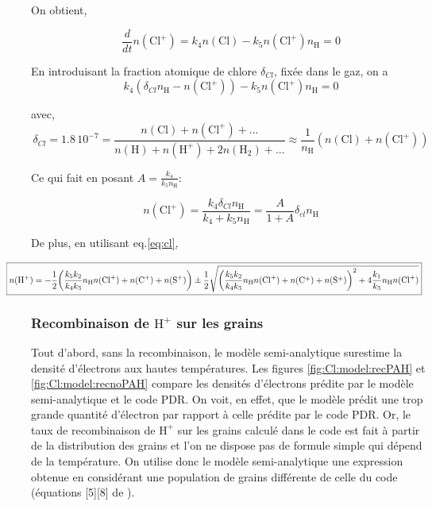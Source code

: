 On obtient,

\begin{equation}
     \frac{d}{dt}n(\mathrm{Cl}^+) = k_4 n(\mathrm{Cl}) - k_5 n(\mathrm{Cl}^+) n_{\mathrm{H}} = 0
     \label{eq:cl}
\end{equation}


En introduisant la fraction atomique de chlore $\delta_{Cl}$, fixée dans le gaz, on a 
\begin{equation}
    k_4(\delta_{Cl}n_{\mathrm{H}} - n(\mathrm{Cl}^+)) - k_5 n(\mathrm{Cl}^+) n_{\mathrm{H}} = 0
\end{equation}

 avec,
\begin{equation}
    \delta_{Cl} = 1.8\,10^{-7} = \frac{n(\mathrm{Cl}) + n(\mathrm{Cl}^+) + ...}{n(\mathrm{H}) + n(\mathrm{H}^+) + 2n(\mathrm{H}_2) + ...} \approx \frac{1}{n_{\mathrm{H}}} (n(\mathrm{Cl}) + n(\mathrm{Cl}^+) )
\end{equation}

Ce qui fait en posant $A = \frac{k_4}{k_5 n_{\mathrm{H}}}$:

\begin{equation}
\boxed{n(\mathrm{Cl}^+) = \frac{k_4 \delta_{Cl} n_{\mathrm{H}}}{k_4 + k_5 n_{\mathrm{H}}} = \frac{A}{1 + A} \delta_{cl} n_{\mathrm{H}}}
\end{equation}

De plus, en utilisant eq.\ref{eq:cl},

\begin{equation}
\hspace{-3em}
\resizebox{1.1\hsize}{!}{
    \boxed{n(\mathrm{H}^+) = -\frac{1}{2} \bigg( \frac{k_5 k_2}{k_4 k_3} n_{\mathrm{H}} n(\mathrm{Cl}^+) + n(\mathrm{C}^+)+ n(\mathrm{S}^+) \bigg) \pm \frac{1}{2} \sqrt{\bigg( \frac{k_5 k_2}{k_4 k_3} n_{\mathrm{H}} n(\mathrm{Cl}^+) + n(\mathrm{C}^+)+ n(\mathrm{S}^+) \bigg)^2 + 4\frac{k_1}{k_3}n_{\mathrm{H}} n(\mathrm{Cl}^+)}}
    }
\end{equation}



\subsubsection{Recombinaison de $\mathrm{H}^+$ sur les grains}

Tout d'abord, sans la recombinaison, le modèle semi-analytique surestime la densité d'électrons aux hautes températures. Les figures \ref{fig:Cl:model:recPAH} et \ref{fig:Cl:model:recnoPAH} compare les densités d'électrons prédite par le modèle semi-analytique et le code PDR. On voit, en effet, que le modèle prédit une trop grande quantité d'électron par rapport à celle prédite par le code PDR. Or, le taux de recombinaison de $\mathrm{H}^+$ sur les grains calculé dans le code est fait à partir de la distribution des grains et l'on ne dispose pas de formule simple qui dépend de la température. On utilise donc le modèle semi-analytique une expression obtenue en considérant une population de grains différente de celle du code (équations [5][8] de \cite{Weingartner_2001}). 

